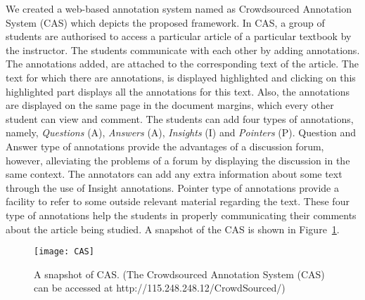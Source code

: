 \documentclass{llncs}
\begin{document}
We created a web-based annotation system named as Crowdsourced Annotation System (CAS) which depicts the proposed framework. In CAS, a group of students are authorised to access a particular article of a particular textbook by the instructor. The students communicate with each other by adding annotations. The annotations added, are attached to the corresponding text of the article. The text for which there are annotations, is displayed highlighted and clicking on this highlighted part displays all the annotations for this text. Also, the annotations are displayed on the same page in the document margins, which every other student can view and comment. The students can add four types of annotations, namely, \textit{Questions} (A), \textit{Answers} (A), \textit{Insights} (I) and \textit{Pointers} (P). Question and Answer type of annotations provide the advantages of a discussion forum, however, alleviating the problems of a forum by displaying the discussion in the same context. The annotators can add any extra information about some text through the use of Insight annotations. Pointer type of annotations provide a facility to refer to some outside relevant material regarding the text. These four type of annotations help the students in properly communicating their comments about the article being studied. A snapshot of the CAS is shown in Figure~\ref{fig:CAS}.
\begin{figure}
\centering
\texttt{[image: CAS]}
\caption{A snapshot of CAS. (The Crowdsourced Annotation System (CAS) can be accessed at http://115.248.248.12/CrowdSourced/)}
\label{fig:CAS}
\end{figure}
\end{document}
